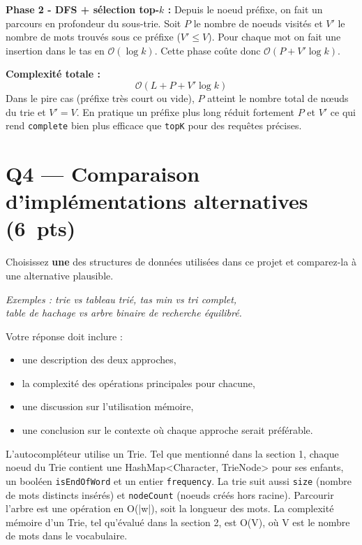 \documentclass[12pt,a4paper]{article}
\newcommand{\pts}[1]{\hfill\textbf{\small(#1~pts)}}
\newcommand{\bigo}[1]{$\mathcal{O}(#1)$}
\begin{document}
{{\textbf{Phase 2 - DFS + sélection top-$k$ :}
Depuis le noeud préfixe, on fait un parcours en profondeur du sous-trie. Soit $P$ le
nombre de noeuds visités et $V'$ le nombre de mots trouvés sous ce préfixe ($V' \leq V$).
Pour chaque mot on fait une insertion dans le tas en \bigo{\log k}. Cette phase
coûte donc \bigo{P + V' \log k}.

\textbf{Complexité totale :}
\[
  \mathcal{O}\!\left(L + P + V' \log k\right)
\]
Dans le pire cas (préfixe très court ou vide), $P$ atteint le nombre total de nœuds du
trie et $V' = V$. En pratique un préfixe plus long réduit fortement $P$ et $V'$ ce
qui rend \texttt{complete} bien plus efficace que \texttt{topK} pour des requêtes précises.

\newpage

\section{Q4 — Comparaison d'implémentations alternatives \pts{6}}

Choisissez \textbf{une} des structures de données utilisées dans ce projet et
comparez-la à une alternative plausible.

\textit{Exemples : trie vs tableau trié, tas min vs tri complet,}\\
\textit{table de hachage vs arbre binaire de recherche équilibré.}

Votre réponse doit inclure :
\begin{itemize}
  \item une description des deux approches,
  \item la complexité des opérations principales pour chacune,
  \item une discussion sur l'utilisation mémoire,
  \item une conclusion sur le contexte où chaque approche serait préférable.
\end{itemize}

L'autocompléteur utilise un Trie. Tel que mentionné dans la section 1, chaque noeud du Trie
contient une HashMap<Character, TrieNode> pour ses enfants, un booléen
\texttt{isEndOfWord} et un entier \texttt{frequency}. La trie suit aussi \texttt{size}
(nombre de mots distincts insérés) et \texttt{nodeCount} (noeuds créés hors racine). 
Parcourir l'arbre est une opération en O(|w|), soit la longueur des mots. La complexité mémoire
d'un Trie, tel qu'évalué dans la section 2, est O(V), où V est le nombre de mots dans le vocabulaire.

}}
\end{document}
